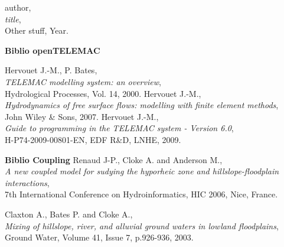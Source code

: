 
\pagebreak


\begin{thebibliography}{99}

  {\sc author},\\
 {\em title},\\
Other stuff, Year.

\vspace{0.5cm}
{\bf Biblio openTELEMAC}

  {\sc Hervouet J.-M., P. Bates},\\
 {\em TELEMAC modelling system: an overview},\\
Hydrological Processes, Vol. 14, 2000.
% 
  {\sc Hervouet J.-M.},\\
 {\em Hydrodynamics of free surface flows: modelling with finite element methods},\\
John Wiley \& Sons, 2007.
% 
  {\sc Hervouet J.-M.},\\
 {\em Guide to programming in the TELEMAC system - Version 6.0},\\
H-P74-2009-00801-EN, EDF R\&D, LNHE, 2009.

\vspace{0.5cm} {\bf Biblio Coupling}
% 
  {\sc Renaud J-P., Cloke A. and Anderson M.},\\
 {\em A new coupled model for sudying the hyporheic zone and hillslope-floodplain interactions},\\
7th International Conference on Hydroinformatics, HIC 2006, Nice, France.

  {\sc Claxton A., Bates P. and Cloke A.},\\
 {\em Mixing of hillslope, river, and alluvial ground waters in lowland floodplains},\\
Ground Water, Volume 41, Issue 7, p.926-936, 2003.

% 
\end{thebibliography}

